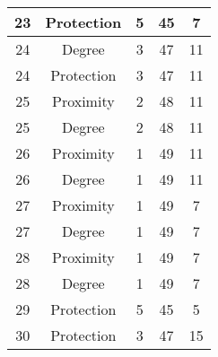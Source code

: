 \documentclass[results.tex]{subfiles}
\begin{document}
\begin{center}
\begin{tabular}{| c || c | c | c | c |}
            \hline
            23                      & Protection                   & 5                      & 45                      & 7                    \\
            \hline
            24                      & Degree                       & 3                      & 47                      & 11                   \\
            \hline
            24                      & Protection                   & 3                      & 47                      & 11                   \\
            \hline
            25                      & Proximity                    & 2                      & 48                      & 11                   \\
            \hline
            25                      & Degree                       & 2                      & 48                      & 11                   \\
            \hline
            26                      & Proximity                    & 1                      & 49                      & 11                   \\
            \hline
            26                      & Degree                       & 1                      & 49                      & 11                   \\
            \hline
            27                      & Proximity                    & 1                      & 49                      & 7                    \\
            \hline
            27                      & Degree                       & 1                      & 49                      & 7                    \\
            \hline
            28                      & Proximity                    & 1                      & 49                      & 7                    \\
            \hline
            28                      & Degree                       & 1                      & 49                      & 7                    \\
            \hline
            29                      & Protection                   & 5                      & 45                      & 5                    \\
            \hline
            30                      & Protection                   & 3                      & 47                      & 15                   \\

\end{tabular}
\end{center}
\end{document}
